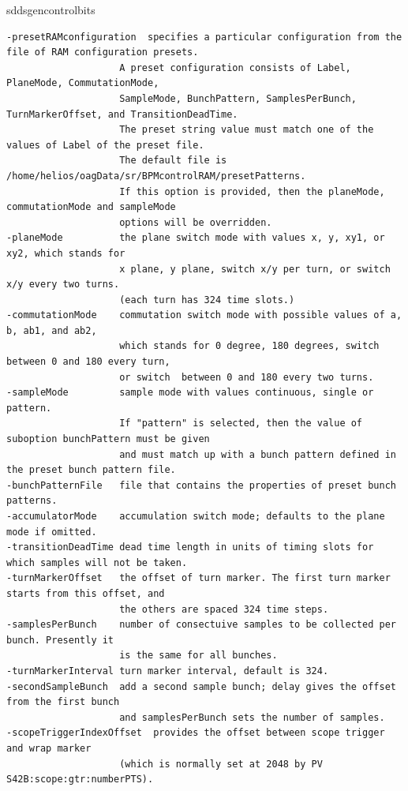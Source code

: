 \begin{sddsprog}{sddsgencontrolbits}
\begin{verbatim}
-presetRAMconfiguration  specifies a particular configuration from the file of RAM configuration presets.
                    A preset configuration consists of Label, PlaneMode, CommutationMode, 
                    SampleMode, BunchPattern, SamplesPerBunch, TurnMarkerOffset, and TransitionDeadTime. 
                    The preset string value must match one of the values of Label of the preset file. 
                    The default file is /home/helios/oagData/sr/BPMcontrolRAM/presetPatterns. 
                    If this option is provided, then the planeMode, commutationMode and sampleMode 
                    options will be overridden. 
-planeMode          the plane switch mode with values x, y, xy1, or xy2, which stands for 
                    x plane, y plane, switch x/y per turn, or switch x/y every two turns. 
                    (each turn has 324 time slots.) 
-commutationMode    commutation switch mode with possible values of a, b, ab1, and ab2, 
                    which stands for 0 degree, 180 degrees, switch between 0 and 180 every turn, 
                    or switch  between 0 and 180 every two turns. 
-sampleMode         sample mode with values continuous, single or pattern.
                    If "pattern" is selected, then the value of suboption bunchPattern must be given
                    and must match up with a bunch pattern defined in the preset bunch pattern file.
-bunchPatternFile   file that contains the properties of preset bunch patterns.
-accumulatorMode    accumulation switch mode; defaults to the plane mode if omitted.
-transitionDeadTime dead time length in units of timing slots for which samples will not be taken.
-turnMarkerOffset   the offset of turn marker. The first turn marker starts from this offset, and
                    the others are spaced 324 time steps.
-samplesPerBunch    number of consectuive samples to be collected per bunch. Presently it
                    is the same for all bunches.
-turnMarkerInterval turn marker interval, default is 324.
-secondSampleBunch  add a second sample bunch; delay gives the offset from the first bunch
                    and samplesPerBunch sets the number of samples.
-scopeTriggerIndexOffset  provides the offset between scope trigger and wrap marker
                    (which is normally set at 2048 by PV S42B:scope:gtr:numberPTS).


\end{verbatim}
\end{sddsprog}
